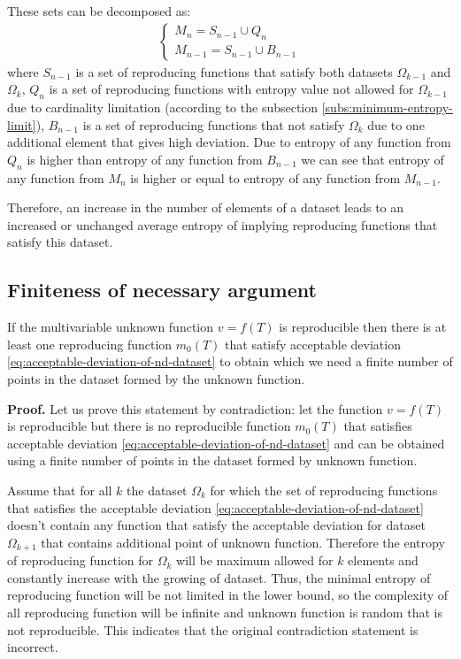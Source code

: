 \documentclass[a4paper, 11pt, oneside]{book}
\begin{document}
These sets can be decomposed as:
\begin{align}\label{eq:increase-entropy-set-unions}
  \begin{cases}
    M_n = S_{n - 1} \cup Q_n \\
    M_{n - 1} = S_{n - 1} \cup B_{n - 1}
  \end{cases}
\end{align}
where $S_{n - 1}$ is a set of reproducing functions that satisfy both datasets $\Omega_{k - 1}$ and $\Omega_k$, $Q_n$ is a set of reproducing functions with entropy value not allowed for $\Omega_{k - 1}$ due to cardinality limitation (according to the subsection \ref{subs:minimum-entropy-limit}), $B_{n - 1}$ is a set of reproducing functions that not satisfy $\Omega_k$ due to one additional element that gives high deviation. Due to entropy of any function from $Q_n$ is higher than entropy of any function from $B_{n - 1}$ we can see that entropy of any function from $M_n$ is higher or equal to entropy of any function from $M_{n - 1}$.

Therefore, an increase in the number of elements of a dataset leads to an increased or unchanged average entropy of implying reproducing functions that satisfy this dataset.

\subsection{Finiteness of necessary argument}
If the multivariable unknown function $v = f(T)$ is reproducible then there is at least one reproducing function $m_0(T)$ that satisfy acceptable deviation \ref{eq:acceptable-deviation-of-nd-dataset} to obtain which we need a finite number of points in the dataset formed by the unknown function.

\textbf{Proof.}
Let us prove this statement by contradiction: let the function $v = f(T)$ is reproducible but there is no reproducible function $m_0(T)$ that satisfies acceptable deviation \ref{eq:acceptable-deviation-of-nd-dataset} and can be obtained using a finite number of points in the dataset formed by unknown function.

Assume that for all $k$ the dataset $\Omega_k$ for which the set of reproducing functions that satisfies the acceptable deviation \ref{eq:acceptable-deviation-of-nd-dataset} doesn't contain any function that satisfy the acceptable deviation for dataset $\Omega_{k + 1}$ that contains additional point of unknown function. Therefore the entropy of reproducing function for $\Omega_k$ will be maximum allowed for $k$ elements and constantly increase with the growing of dataset. Thus, the minimal entropy of reproducing function will be not limited in the lower bound, so the complexity of all reproducing function will be infinite and unknown function is random that is not reproducible. This indicates that the original contradiction statement is incorrect.
\end{document}
